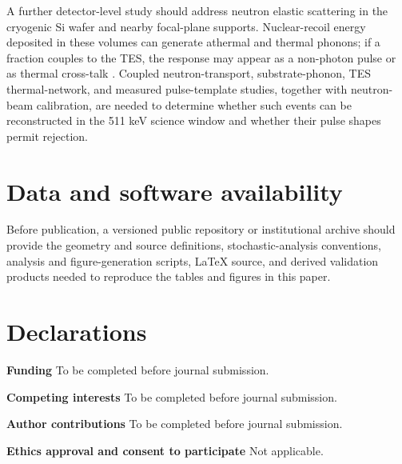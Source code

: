 \documentclass[11pt]{article}
\begin{document}
\newpage
\begin{samepage}
A further detector-level study should address neutron elastic scattering in
the cryogenic Si wafer and nearby focal-plane supports. Nuclear-recoil energy
deposited in these volumes can generate athermal and thermal phonons; if a
fraction couples to the TES, the response may appear as a non-photon pulse or
as thermal cross-talk \cite{Agnese2018NuclearRecoil,Hull2023ThermalBackground}.
Coupled neutron-transport, substrate-phonon, TES thermal-network, and measured
pulse-template studies, together with neutron-beam calibration, are needed to
determine whether such events can be reconstructed in the 511 keV science
window and whether their pulse shapes permit rejection.
\end{samepage}

\section*{Data and software availability}
Before publication, a versioned public repository or institutional archive should provide the geometry and source definitions, stochastic-analysis conventions, analysis and figure-generation scripts, LaTeX source, and derived validation products needed to reproduce the tables and figures in this paper.

\section*{Declarations}
\textbf{Funding} To be completed before journal submission.

\textbf{Competing interests} To be completed before journal submission.

\textbf{Author contributions} To be completed before journal submission.

\textbf{Ethics approval and consent to participate} Not applicable.
\end{document}
